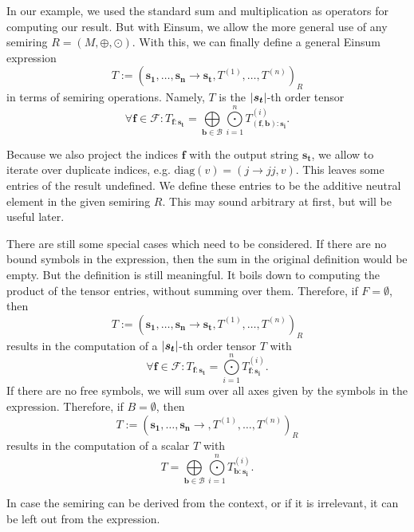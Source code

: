 \begin{definition}
    In our example, we used the standard sum and multiplication as operators for computing our result.
    But with Einsum, we allow the more general use of any semiring $R = (M, \oplus, \odot)$.
    With this, we can finally define a general Einsum expression
    $$T := (\bm{s_1},\dots,\bm{s_n} \rightarrow \bm{s_t}, T^{(1)},\dots,T^{(n)})_R$$
    in terms of semiring operations. Namely, $T$ is the $\left\lvert \bm{s_t} \right\rvert$-th order tensor
    $$\forall \bm{f} \in \mathcal{F}: T_{\bm{f}: \bm{s_t}} = \bigoplus\limits_{\bm{b} \in \mathcal{B}} \bigodot\limits_{i = 1}^{n} T^{(i)}_{(\bm{f},\bm{b}):\bm{s_i}}.$$

    Because we also project the indices $\bm{f}$ with the output string $\bm{s_t}$, we allow to iterate over duplicate indices,
    e.g. $\text{diag}(v) = (j \rightarrow jj, v)$.
    This leaves some entries of the result undefined.
    We define these entries to be the additive neutral element in the given semiring $R$.
    This may sound arbitrary at first, but will be useful later.

    There are still some special cases which need to be considered.
    If there are no bound symbols in the expression, then the sum in the original definition would be empty.
    But the definition is still meaningful.
    It boils down to computing the product of the tensor entries, without summing over them.
    Therefore, if $F = \emptyset$, then
    $$T := (\bm{s_1},\dots,\bm{s_n} \rightarrow \bm{s_t}, T^{(1)},\dots,T^{(n)})_R$$
    results in the computation of a $\left\lvert \bm{s_t} \right\rvert$-th order tensor $T$ with
    $$\forall \bm{f} \in \mathcal{F}: T_{\bm{f}: \bm{s_t}} = \bigodot\limits_{i = 1}^{n} T^{(i)}_{\bm{f}:\bm{s_i}}.$$
    If there are no free symbols, we will sum over all axes given by the symbols in the expression.
    Therefore, if $B = \emptyset$, then
    $$T := (\bm{s_1},\dots,\bm{s_n} \rightarrow , T^{(1)},\dots,T^{(n)})_R$$
    results in the computation of a scalar $T$ with
    $$T = \bigoplus\limits_{\bm{b} \in \mathcal{B}} \bigodot\limits_{i = 1}^{n} T^{(i)}_{\bm{b}:\bm{s_i}}.$$

    In case the semiring can be derived from the context, or if it is irrelevant, it can be left out from the expression.
\end{definition}